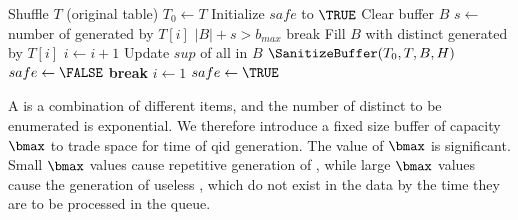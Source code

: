 \begin{algorithm}[h]
\small
\caption{$\PartialSuppression(T,\bmax)$}
\label{algo:partialsuppression}
\begin{algorithmic}[1]
\STATE Shuffle $T$ (original table)
\STATE $T_0 \gets T$ %
\STATE Initialize $safe$ to $\TRUE$
    \LOOP
        \STATE Clear buffer $B$
         \label{algo:enu_s}
            \STATE $s \gets$ number of \qids generated by $T[i]$
            \IF $|B|+s>b_{max}$
                \STATE break
            \ELSE
             \STATE Fill $B$ with distinct \qids generated by $T[i]$ \label{algo:enumerate1}
             \STATE $i\leftarrow i+1$
            \ENDIF
        \ENDWHILE \label{algo:enu_e}
        \STATE Update $sup$ of all \qids in $B$ \label{algo:enumerate2}
        \label{line:containunsafe}
            \STATE $\SanitizeBuffer(T_0, T, B, H)$\label{line:sanitizebuffer}
            \STATE $safe\leftarrow\FALSE$
        \ENDIF
                \STATE \textbf{break}\label{algo:partialbreak}
            \ELSE
                \STATE $i\leftarrow 1$
                \STATE $safe\leftarrow\TRUE$
            \ENDIF
        \ENDIF
    \ENDLOOP
\end{algorithmic}
\end{algorithm}

A \qid is a combination of different items,
and the number of distinct \qids to be enumerated is exponential.
We therefore introduce a fixed size \qid buffer of
capacity $\bmax$ to trade space for time of qid generation.
The value of $\bmax$ is significant. Small $\bmax$ values cause
repetitive generation of \qids, while large $\bmax$ values cause the generation
of useless \qids, which do not exist in the data
by the time they are to be processed in the queue.

